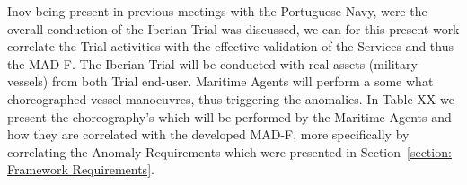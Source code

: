Inov being present in previous meetings with the Portuguese Navy, were the overall conduction of the Iberian Trial was discussed, we can for this present work correlate the Trial activities with the effective validation of the Services and thus the MAD-F.
The Iberian Trial will be conducted with real assets (military vessels) from both Trial end-user. Maritime Agents will perform a some what choreographed vessel manoeuvres, thus triggering the anomalies. In Table XX we present the choreography's which will be performed by the Maritime Agents and how they are correlated with the developed  MAD-F, more specifically by correlating the Anomaly Requirements which were presented in Section~\ref{section: Framework Requirements}. 


\begin{table}[H]
\centering
\caption{Part of the Choreography conducted for the Iberian Trial. Where V1 and V2 represent a vessel from each end-user, and OC the Operation Control.}
\label{my-label}
\end{table}
